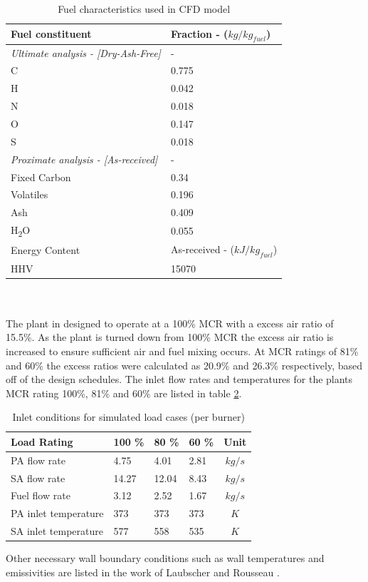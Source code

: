 \documentclass{webofc}
\begin{document}
\begin{table}[h!]
\centering
\caption{Fuel characteristics used in CFD model} \label{tab_fuel}
\begin{tabular}{ll}
\hline
Fuel constituent & Fraction - ($kg/kg_{fuel}$)   \\
\hline
\textit{Ultimate analysis - [Dry-Ash-Free]} & -  \\
C & 0.775 \\
H & 0.042 \\
N & 0.018 \\
O & 0.147 \\
S & 0.018 \\
\textit{Proximate analysis - [As-received]} & -\\
Fixed Carbon & 0.34\\
Volatiles & 0.196\\
Ash & 0.409\\
H\textsubscript{2}O & 0.055\\
\hline
Energy Content & As-received - ($kJ/kg_{fuel}$)\\
\hline
HHV & 15070 \\
\hline
\end{tabular}
\end{table}\\
\\
The plant in designed to operate at a 100\% MCR with a excess air ratio of 15.5\%. As the plant is turned down from 100\% MCR the excess air ratio is increased to ensure sufficient air and fuel mixing occurs. At MCR ratings of 81\% and 60\% the excess ratios were calculated as 20.9\% and 26.3\% respectively, based off of the design schedules. The inlet flow rates and temperatures for the plants MCR rating 100\%, 81\% and 60\% are listed in table \ref{tab_inlets}.\\
\begin{table}[h!]
\centering
\caption{Inlet conditions for simulated load cases (per burner)}\label{tab_inlets}       
\begin{tabular}{llllc}
\hline
Load Rating & 100 \% & 80 \% & 60 \% & Unit  \\
\hline
PA flow rate & 4.75 & 4.01 & 2.81 & $kg/s$   \\
SA flow rate & 14.27 & 12.04 & 8.43 & $kg/s$ \\
Fuel flow rate & 3.12 & 2.52 & 1.67 & $kg/s$ \\
PA inlet temperature & 373 & 373 & 373 & $K$ \\
SA inlet temperature & 577 &558 & 535 & $K$  \\
\hline
\end{tabular}
\end{table}
Other necessary wall boundary conditions such as wall temperatures and emissivities are listed in the work of Laubscher and Rousseau \cite{laubscher_1}.
\end{document}
